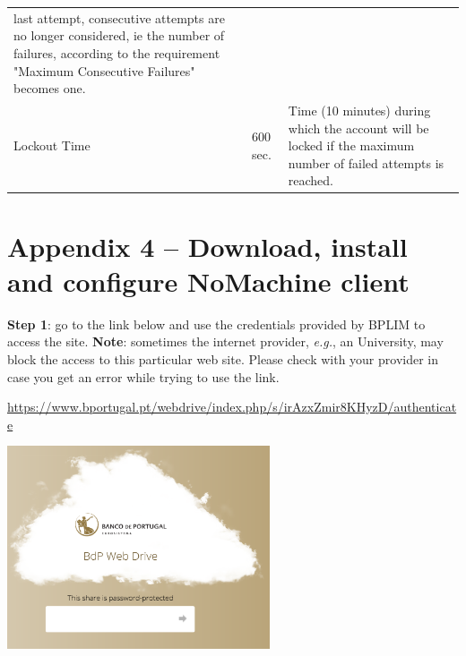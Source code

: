 \documentclass[]{book}
\begin{document}
\begin{longtable}[]{@{}lll@{}}
\begin{minipage}[t]{0.30\columnwidth}
last attempt,
consecutive attempts
are no longer
considered, ie the
number of failures,
according to the
requirement "Maximum
Consecutive
Failures" becomes
one.\strut
\end{minipage}\tabularnewline
\begin{minipage}[t]{0.30\columnwidth}\raggedright
Lockout Time\strut
\end{minipage} & \begin{minipage}[t]{0.30\columnwidth}\raggedright
600 sec.\strut
\end{minipage} & \begin{minipage}[t]{0.30\columnwidth}\raggedright
Time (10 minutes)
during which the
account will be
locked if the maximum
number of failed
attempts is reached.\strut
\end{minipage}\tabularnewline
\bottomrule
\end{longtable}

\hypertarget{appendix-4-download-install-and-configure-nomachine-client}{%
\section{\texorpdfstring{{Appendix 4 -- Download, install and configure NoMachine client}}{Appendix 4 -- Download, install and configure NoMachine client}}\label{appendix-4-download-install-and-configure-nomachine-client}}

\textbf{Step 1}: go to the link below and use the credentials provided by
BPLIM to access the site. \textbf{Note}: sometimes the internet provider,
\emph{e.g.}, an University, may block the access to this particular web site.
Please check with your provider in case you get an error while trying to
use the link.

\url{https://www.bportugal.pt/webdrive/index.php/s/irAzxZmir8KHyzD/authenticate}

\includegraphics[width=3.0528in,height=2.3622in]{./media/image17.png}
\end{document}

